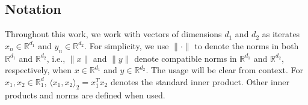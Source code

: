 \documentclass[letterpaper, 10 pt, conference]{ieeeconf}  %
\theoremstyle{definition}
\theoremstyle{plain}
\newcommand{\RR}{\mathbb{R}}
\begin{document}
\subsection{Notation}

Throughout this work, we work with vectors of dimensions $d_1$ and $d_2$ as iterates $x_n\in\RR^{d_1}$ and $y_n\in\RR^{d_2}$. For simplicity, we use $\|\cdot\|$ to denote the norms in both $\RR^{d_1}$ and $\RR^{d_2}$, i.e., $\|x\|$ and $\|y\|$ denote compatible norms in $\RR^{d_1}$ and $\RR^{d_2}$, respectively, when $x\in\RR^{d_1}$ and $y\in\RR^{d_2}$. The usage will be clear from context. For $x_1,x_2\in\RR^d_1$, $\langle x_1,x_2\rangle_2=x_1^Tx_2$ denotes the standard inner product. Other inner products and norms are defined when used.
\end{document}
